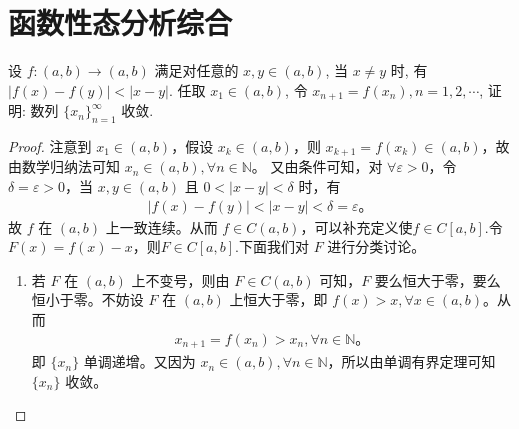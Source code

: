 \documentclass[../../main.tex]{subfiles}
\begin{document}
\section{函数性态分析综合}

\begin{proposition}
设 $f : (a, b) \to (a, b)$ 满足对任意的 $x, y \in (a, b)$, 当 $x \neq y$ 时, 有 $\left| f(x) - f(y) \right| < \left| x - y \right|$. 任取 $x_1 \in (a, b)$, 令 $x_{n+1} = f(x_n), n = 1, 2, \cdots$, 证明: 数列 $\{x_n\}_{n=1}^{\infty}$ 收敛.
\end{proposition}
\begin{proof}
注意到 $x_1 \in (a, b)$，假设 $x_k \in (a, b)$，则 $x_{k+1} = f(x_k) \in (a, b)$，故由数学归纳法可知 $x_n \in (a, b), \forall n \in \mathbb{N}$。
又由条件可知，对 $\forall \varepsilon > 0$，令 $\delta = \varepsilon > 0$，当 $x, y \in (a, b)$ 且 $0 < |x - y| < \delta$ 时，有
\begin{align*}
|f(x) - f(y)| < |x - y| < \delta = \varepsilon。
\end{align*}
故 $f$ 在 $(a, b)$ 上一致连续。从而 $f \in C(a, b)$，可以补充定义使$f\in C[a,b]$.令 $F(x) = f(x) - x$，则$F \in C[a, b]$.下面我们对 $F$ 进行分类讨论。

\begin{enumerate}[(1)]
\item 若 $F$ 在 $(a, b)$ 上不变号，则由 $F \in C(a, b)$ 可知，$F$ 要么恒大于零，要么恒小于零。不妨设 $F$ 在 $(a, b)$ 上恒大于零，即 $f(x) > x, \forall x \in (a, b)$。从而
\begin{align*}
x_{n+1} = f(x_n) > x_n, \forall n \in \mathbb{N}。
\end{align*}
即 $\{x_n\}$ 单调递增。又因为 $x_n \in (a, b), \forall n \in \mathbb{N}$，所以由单调有界定理可知 $\{x_n\}$ 收敛。


\end{enumerate}
\end{proof}
\end{document}
